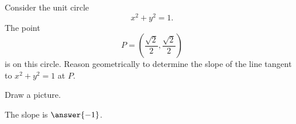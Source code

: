 \documentclass{ximera}
\begin{document}
\begin{problem}
  Consider the unit circle
  \[
  x^2 + y^2 = 1.
  \]
  The point
  \[
  P=\left(\frac{\sqrt{2}}{2},\frac{\sqrt{2}}{2}\right)
  \]
  is on this circle. Reason geometrically to determine the slope of
  the line tangent to $x^2 + y^2 = 1$ at $P$.
  \begin{hint}
    Draw a picture.
  \end{hint}
  \begin{prompt}
    The slope is $\answer{-1}$.
  \end{prompt}
\end{problem}





\end{document}
